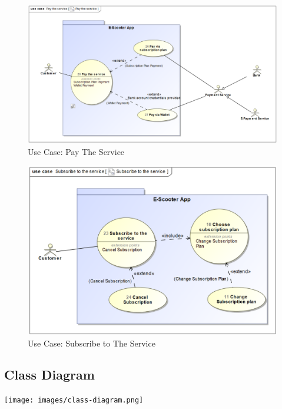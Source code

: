 \documentclass[a4paper, 12pt]{article}
\begin{document}
\begin{figure} [htbp]
  \begin{center}
    \includegraphics[scale=0.58]{images/UseCases/PayTheService.png}
  \end{center}
  \caption{Use Case: Pay The Service}
\end{figure}

\begin{figure} [htbp]
  \begin{center}
    \includegraphics[scale=0.7]{images/UseCases/SubscribeToTheService.png}
  \end{center}
  \caption{Use Case: Subscribe to The Service}
\end{figure}



\newpage
\subsection{Class Diagram}
  \begin{center}
    \texttt{[image: images/class-diagram.png]}
  \end{center}
  
\end{document}
